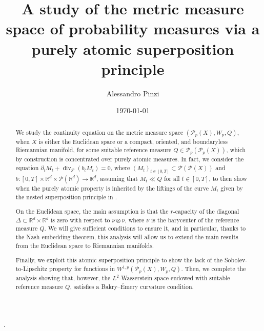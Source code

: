 \documentclass[10pt,leqno]{amsart}
\title[The metric measure space of probability measures]{A study of the metric measure space of probability measures via a purely atomic superposition principle}
\author{Alessandro Pinzi}
\date{\today}
\numberwithin{equation}{section}
\newcommand{\R}{\mathbb{R}}
\newcommand{\Q}{\mathbb{Q}}
\newcommand{\PP}{\mathcal{P}}
\renewcommand{\Q}{Q}
\begin{document}
\begin{abstract}
We study the continuity equation on the metric measure space $(\PP_p(X),W_p,\Q)$, when $X$ is either the Euclidean space or a compact, oriented, and boundaryless Riemannian manifold, for some suitable reference measure $\Q \in \PP_p(\PP_p(X))$, which by construction is concentrated over purely atomic measures. In fact, we consider the equation $\partial_tM_t +\operatorname{div}_{\PP}(b_tM_t) = 0$, where $(M_t)_{t\in[0,T]} \subset\PP(\PP(X))$ and $b:[0,T]\times \R^d \times \PP(\R^d) \to \R^d$, assuming that $M_t\ll \Q$ for all $t\in[0,T]$, to then show when the purely atomic property is inherited by the liftings of the curve $M_t$ given by the nested superposition principle in \cite{pinzisavare2025}.

On the Euclidean space, the main assumption is that the $r$-capacity of the diagonal $\Delta \subset \R^d \times \R^d$ is zero with respect to $\nu \otimes \nu$, where $\nu$ is the barycenter of the reference measure $\Q$. We will give sufficient conditions to ensure it, and in particular, thanks to the Nash embedding theorem, this analysis will allow us to extend the main results from the Euclidean space to Riemannian manifolds. 

Finally, we exploit this atomic superposition principle to show the lack of the Sobolev-to-Lipschitz property for functions in $W^{1,p}(\PP_p(X),W_p,Q)$. Then, we complete the analysis showing that, however, the $L^2$-Wasserstein space endowed with suitable reference measure $Q$, satisfies a Bakry--\'Emery curvature condition.
\end{abstract}

\maketitle

{\small
		.
		\par
	}

{\small\tableofcontents}
\end{document}
